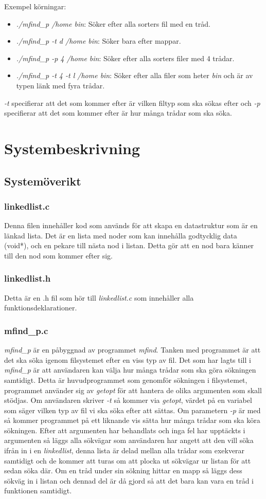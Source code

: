 \documentclass[11pt, titlepage, oneside, a4paper]{article}
\newcommand{\Section}[1]{\section{#1}\vspace{-8pt}}
\newcommand{\Subsection}[1]{\vspace{-4pt}\subsection{#1}\vspace{-8pt}}
\newcommand{\Subsubsection}[1]{\vspace{-4pt}\subsubsection{#1}\vspace{-8pt}}
\begin{document}
		Exempel körningar:
		\begin{itemize}
		 \item \emph{./mfind\_p /home bin}: Söker efter alla sorters fil med en tråd.
		 \item \emph{./mfind\_p -t d /home bin}: Söker bara efter mappar.
		 \item \emph{./mfind\_p -p 4 /home bin}: Söker efter alla sorters filer med 4 trådar.
		 \item \emph{./mfind\_p -t 4 -t l /home bin}: Söker efter alla filer som heter \emph{bin} och är av typen länk med fyra trådar.
		\end{itemize}
		
		\emph{-t} specifierar att det som kommer efter är vilken filtyp som ska sökas efter och \emph{-p} specifierar att det som kommer efter är hur många trådar som ska söka.

	\Section{Systembeskrivning}

		\Subsection{Systemöverikt}
		
		\Subsubsection{linkedlist.c}
		Denna filen innehåller kod som används för att skapa en datastruktur som är en länkad lista. Det är en lista med noder som kan innehålla godtycklig data (void*), och en pekare till nästa nod i listan. 
		Detta gör att en nod bara känner till den nod som kommer efter sig.
		
		\Subsubsection{linkedlist.h}
		Detta är en .h fil som hör till \emph{linkedlist.c} som innehåller alla funktionsdeklarationer.
		
		\Subsubsection{mfind\_p.c}
		\emph{mfind\_p} är en påbyggnad av programmet \emph{mfind}. Tanken med programmet är att det ska söka igenom filsystemet efter en viss typ av fil. Det som har lagts till 
		i \emph{mfind\_p} är att användaren kan välja hur många trådar som ska göra sökningen samtidigt.
		Detta är huvudprogrammet som genomför sökningen i filsystemet, programmet använder sig av \emph{getopt} för att hantera de olika argumenten som skall stödjas.
		Om användaren skriver \emph{-t} så kommer via \emph{getopt}, värdet på en variabel som säger vilken typ av fil vi ska söka efter att sättas. Om parametern \emph{-p} är med så kommer programmet på ett liknande vis sätta hur många trådar som ska köra sökningen.
		Efter att argumenten har behandlats och inga fel har upptäckts i argumenten så läggs alla sökvägar som användaren har angett att den vill söka ifrån in i en \emph{linkedlist}, 
		denna lista är delad mellan alla trådar som exekverar samtidigt och de kommer att turas om att plocka ut sökvägar ur listan för att sedan söka där. Om en tråd under sin sökning 
		hittar en mapp så läggs dess sökväg in i listan och dennad del är då gjord så att det bara kan vara en tråd i funktionen samtidigt.
		
\end{document}
